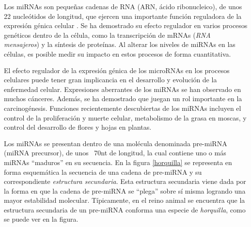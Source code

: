 \documentclass[12pt,bibliography=openstyle,DIV=12,parskip=full-]{scrartcl}
\begin{document}
Los miRNAs son pequeñas cadenas de RNA (ARN, ácido ribonucleico), de unos 22 nucleótidos de
longitud, que ejercen una importante función reguladora de la
expresión génica celular \cite{bartel116}.  Se ha demostrado su efecto
regulador en varios procesos genéticos dentro de la célula, como la
transcripción de mRNAs (\emph{RNA mensajeros}) y la síntesis de
proteínas. Al alterar los niveles de miRNAs en las células, es posible
medir su impacto en estos procesos de forma cuantitativa. \cite{lili}

El efecto regulador de la expresión génica de los microRNAs en los
procesos celulares puede tener gran implicancia en el desarrollo y
evolución de la enfermedad celular. Expresiones aberrantes de los
miRNAs se han observado en muchos cánceres. Además, se ha demostrado
que juegan un rol importante en la carcinogénesis. \cite{lili}
Funciones recientemente descubiertas de los miRNAs incluyen el control
de la proliferación y muerte celular, metabolismo de la grasa en
moscas, y control del desarrollo de flores y hojas en
plantas. \cite{bartel116}

\newpage
Los miRNAs se presentan dentro de una molécula denominada pre-miRNA
(miRNA precursor), de unos ~70nt de longitud, la cual contiene uno o
más miRNAs ``maduros'' en su secuencia.  En la figura \ref{horquilla} se representa
en forma esquemática la secuencia de una cadena de pre-miRNA y su
correspondiente \emph{estructura secundaria}. Esta estructura
secundaria viene dada por la forma en que la cadena de pre-miRNA se
``plega'' sobre sí misma logrando una mayor estabilidad
molecular. Típicamente, en el reino animal se encuentra que la
estructura secundaria de un pre-miRNA conforma una especie de
\emph{horquilla}, como se puede ver en la figura.
\cite{bartel116}\cite{sewer}
\end{document}

